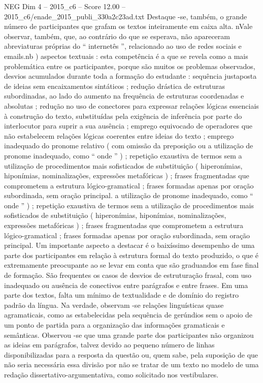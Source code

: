 \begin{textsample}{NEG Dim 4 – 2015\_c6 – Score 12.00 – 2015\_c6/enade\_2015\_publi\_330a2c23ad.txt}
Destaque -se, também, o grande número de participantes que grafam os textos inteiramente em caixa alta. nVale observar, também, que, ao contrário do que se esperava, não apareceram abreviaturas próprias do “ internetês ”, relacionado ao uso de redes sociais e emails.nb ) aspectos textuais : esta competência é a que se revela como a mais problemática entre os participantes, porque são muitos os problemas observados, desvios acumulados durante toda a formação do estudante : sequência justaposta de ideias sem encaixamentos sintáticos ; redução drástica de estruturas subordinadas, ao lado do aumento na frequência de estruturas coordenadas e absolutas ; redução no uso de conectores para expressar relações lógicas essenciais à construção do texto, substituídas pela exigência de inferência por parte do interlocutor para suprir a sua ausência ; emprego equivocado de operadores que não estabelecem relações lógicas coerentes entre ideias do texto ; emprego inadequado do pronome relativo ( com omissão da preposição ou a utilização de pronome inadequado, como “ onde ” ) ; repetição exaustiva de termos sem a utilização de procedimentos mais sofisticados de substituição ( hiperonímias, hiponímias, nominalizações, expressões metafóricas ) ; frases fragmentadas que comprometem a estrutura lógico-gramatical ; frases formadas apenas por oração subordinada, sem oração principal. a utilização de pronome inadequado, como “ onde ” ) ; repetição exaustiva de termos sem a utilização de procedimentos mais sofisticados de substituição ( hiperonímias, hiponímias, nominalizações, expressões metafóricas ) ; frases fragmentadas que comprometem a estrutura lógico-gramatical ; frases formadas apenas por oração subordinada, sem oração principal.
Um importante aspecto a destacar é o baixíssimo desempenho de uma parte dos participantes em relação à estrutura formal do texto produzido, o que é extremamente preocupante ao se levar em conta que são graduandos em fase final de formação.
São frequentes os casos de desvios de estruturação frasal, com uso inadequado ou ausência de conectivos entre parágrafos e entre frases.
Em uma parte dos textos, falta um mínimo de textualidade e de domínio do registro padrão da língua.
Na verdade, observam -se relações linguísticas quase agramaticais, como as estabelecidas pela sequência de gerúndios sem o apoio de um ponto de partida para a organização das informações gramaticais e semânticas.
Observou -se que uma grande parte dos participantes não organizou as ideias em parágrafos, talvez devido ao pequeno número de linhas disponibilizadas para a resposta da questão ou, quem sabe, pela suposição de que não seria necessária essa divisão por não se tratar de um texto no modelo de uma redação dissertativo-argumentativa, como solicitado nos vestibulares.

\end{textsample}
